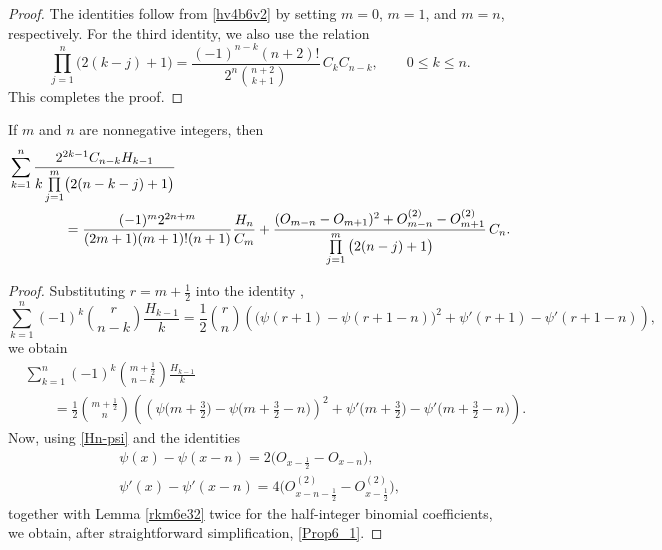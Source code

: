 \documentclass[12pt,reqno]{article}
\begin{document}
\begin{proof}
The identities follow from \eqref{hv4b6v2} by setting $m=0$, $m=1$, and $m=n$, respectively. For the third identity, we also use the relation
\begin{equation}\label{prod(2k-2j+1)} \prod_{j=1}^{n}\big({2(k-j)+1}\big) = \frac{(-1)^{n-k}(n+2)!}{2^n\binom{n+2}{k+1}}\,C_kC_{n-k}, \qquad 0\le k\le n.
\end{equation}
This completes the proof.
\end{proof}
\begin{proposition}
If $m$ and $n$ are nonnegative integers, then
\begin{align}
&\sum_{k = 1}^{n} \frac{2^{2k-1}  C_{n-k}H_{k - 1}}{k\prod\limits_{j = 1}^m \!{\big(2(n- k - j) + 1\big)}}  \notag\\
&\qquad\qquad= \frac{(-1)^m 2^{2n+m}}{(2m+1)(m+1)!(n+1)}\frac{H_n}{C_m} + \frac{(O_{m-n}-O_{m+1})^2+O^{(2)}_{m-n}-O^{(2)}_{m+1}}{{\prod\limits_{j = 1}^m {\big( {2( {n - j} ) + 1} \big)} }}\,C_n.\label{Prop6_1}
\end{align}
\end{proposition}
\begin{proof} Substituting $r=m+\frac{1}{2}$ into the identity \cite[Theorem 2.4]{batirsofo23},
\begin{equation*}
		\sum_{k=1}^n (-1)^k \binom{r}{n-k}\frac{H_{k-1}}{k}=
		\frac{1}{2}\binom{r}{n}
		\!\left(
		\bigl(\psi(r+1)-\psi(r+1-n)\bigr)^2
		+\psi'(r+1)-\psi'(r+1-n)
		\right)\!,
\end{equation*}
		we obtain
		\begin{align*}
		&\sum_{k=1}^n (-1)^k
		\binom{m+\frac12}{n-k}\frac{H_{k-1}}{k}\\
		&\qquad=
		\frac{1}{2}\binom{m+\frac12}{n}\!
		\left(
		\left(
		\psi\Big(m+\frac32\Big)
		-\psi\Big(m+\frac32-n\Big)
		\right)^2
		+\psi'\Big(m+\frac32\Big)
		-\psi'\Big(m+\frac32-n\Big)
		\right).
		\end{align*}
		Now, using \eqref{Hn-psi} and the identities
		\begin{gather*}
		\psi(x)-\psi(x-n)=
		2\bigl(O_{x-\frac12}-O_{x-n}\bigr),\\
		\psi'(x)-\psi'(x-n)
		=
		4\bigl(O_{x-n-\frac12}^{(2)}-O_{x-\frac12}^{(2)}\bigr),
		\end{gather*}
		together with Lemma \ref{rkm6e32} twice for the half-integer binomial coefficients, we obtain, after straightforward simplification, \eqref{Prop6_1}.
\end{proof}
\end{document}
